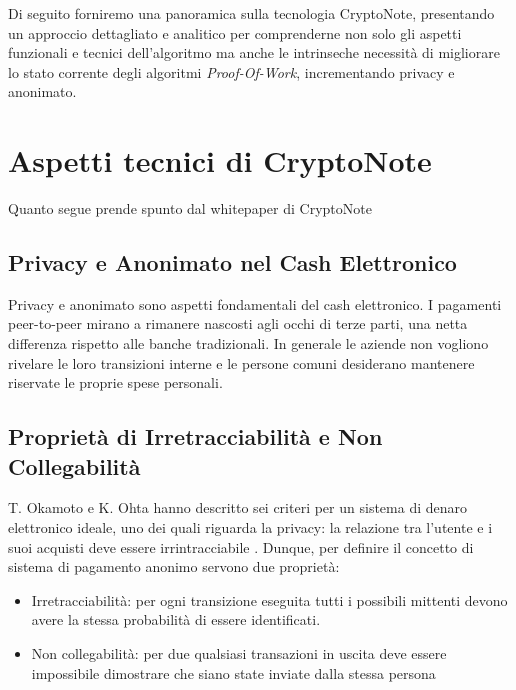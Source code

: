 Di seguito forniremo una panoramica sulla tecnologia CryptoNote,
presentando un approccio dettagliato e analitico per comprenderne non
solo gli aspetti funzionali e tecnici dell'algoritmo ma anche le
intrinseche necessità di migliorare lo stato corrente degli algoritmi
\emph{Proof-Of-Work}, incrementando privacy e anonimato.\\

\section{Aspetti tecnici di
CryptoNote}\label{aspetti-tecnici-di-cryptonote}

Quanto segue prende spunto dal whitepaper di CryptoNote \cite{cryptonotev2}

\subsection{Privacy e Anonimato nel Cash
Elettronico}\label{privacy-e-anonimato-nel-cash-elettronico}

Privacy e anonimato sono aspetti fondamentali del cash elettronico. I
pagamenti peer-to-peer mirano a rimanere nascosti agli occhi di terze
parti, una netta differenza rispetto alle banche tradizionali. In
generale le aziende non vogliono rivelare le loro transizioni interne e
le persone comuni desiderano mantenere riservate le proprie spese
personali.

\subsection{Proprietà di Irretracciabilità e Non
Collegabilità}\label{proprieta-di-irretracciabilita-e-non-collegabilita}

T. Okamoto e K. Ohta hanno descritto sei criteri per un sistema di
denaro elettronico ideale, uno dei quali riguarda la privacy: la
relazione tra l'utente e i suoi acquisti deve essere irrintracciabile
\cite{okamoto1991universal}. Dunque, per definire il concetto di sistema di pagamento
anonimo servono due proprietà:

\begin{itemize}
\item
  Irretracciabilità: per ogni transizione eseguita tutti i possibili
  mittenti devono avere la stessa probabilità di essere identificati.
\item
  Non collegabilità: per due qualsiasi transazioni in uscita deve essere
  impossibile dimostrare che siano state inviate dalla stessa persona
\end{itemize}

